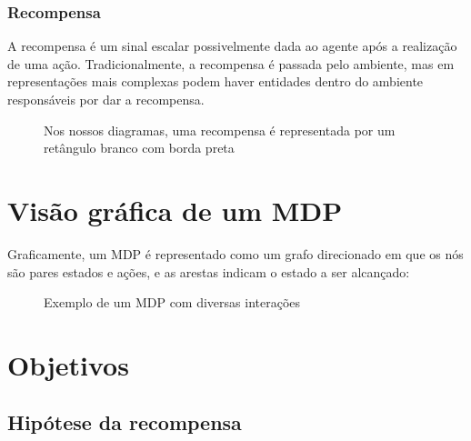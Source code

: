 \documentclass{article}
\begin{document}
            \subsubsection{Recompensa}
            
                A recompensa é um sinal escalar possivelmente dada ao agente após a realização de uma ação. Tradicionalmente, a recompensa é passada pelo ambiente, mas em representações mais complexas podem haver entidades dentro do ambiente responsáveis por dar a recompensa.
        
                \begin{figure}[ht]
                    \centering
                    \caption{Nos nossos diagramas, uma recompensa é representada por um retângulo branco com borda preta}
                    \label{diag:reward-label}
                \end{figure}
        
    \section{Visão gráfica de um MDP}
    
        Graficamente, um MDP é representado como um grafo direcionado em que os nós são pares estados e ações, e as arestas indicam o estado a ser alcançado:
    
        \begin{figure}[ht]
            \centering
            \mdpbig
            \caption{Exemplo de um MDP com diversas interações}
            \label{diag:mdp-big}
        \end{figure}
        
    
    
    \section{Objetivos}
    
        \subsection{Hipótese da recompensa}
    
\end{document}
